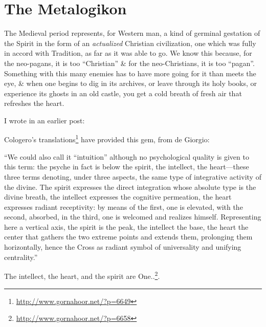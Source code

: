 \section{The Metalogikon}

The Medieval period represents, for Western man, a kind of germinal gestation of the Spirit in the form of an \emph{actualized} Christian civilization, one which was fully in accord with Tradition, as far as it was able to go. We know this because, for the neo-pagans, it is too ``Christian'' \& for the neo-Christians, it is too ``pagan''. Something with this many enemies has to have more going for it than meets the eye, \& when one begins to dig in its archives, or leave through its holy books, or experience its ghosts in an old castle, you get a cold breath of fresh air that refreshes the heart.

I wrote in an earlier post:

\begin{quotationx}
Cologero's translations\footnote{\url{http://www.gornahoor.net/?p=6649}} have provided this gem, from de Giorgio:

``We could also call it ``intuition'' although no psychological quality is given to this term: the psyche in fact is below the spirit, the intellect, the heart---these three terms denoting, under three aspects, the same type of integrative activity of the divine. The spirit expresses the direct integration whose absolute type is the divine breath, the intellect expresses the cognitive permeation, the heart expresses radiant receptivity: by means of the first, one is elevated, with the second, absorbed, in the third, one is welcomed and realizes himself. Representing here a vertical axis, the spirit is the peak, the intellect the base, the heart the center that gathers the two extreme points and extends them, prolonging them horizontally, hence the Cross as radiant symbol of universality and unifying centrality.''

The intellect, the heart, and the spirit are One..\footnote{\url{http://www.gornahoor.net/?p=6658}}.
\end{quotationx}


